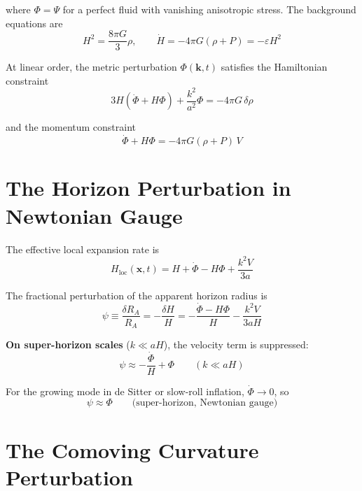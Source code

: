 \documentclass[12pt,a4paper]{article}
\begin{document}
where $\Phi = \Psi$ for a perfect fluid with vanishing anisotropic stress. The background equations are
\begin{equation}
H^2 = \frac{8\pi G}{3}\rho, \qquad \dot{H} = -4\pi G(\rho + P) = -\varepsilon H^2 \tag{3}
\end{equation}

At linear order, the metric perturbation $\Phi(\mathbf{k}, t)$ satisfies the Hamiltonian constraint
\begin{equation}
3H(\dot{\Phi} + H\Phi) + \frac{k^2}{a^2}\Phi = -4\pi G\,\delta\rho \tag{4}
\end{equation}

and the momentum constraint
\begin{equation}
\dot{\Phi} + H\Phi = -4\pi G(\rho + P)\,V \tag{5}
\end{equation}

\section{The Horizon Perturbation in Newtonian Gauge}

The effective local expansion rate is
\begin{equation}
H_\text{loc}(\mathbf{x}, t) = H + \dot{\Phi} - H\Phi + \frac{k^2 V}{3a} \tag{6}
\end{equation}

The fractional perturbation of the apparent horizon radius is
\begin{equation}
\psi \equiv \frac{\delta R_A}{R_A} = -\frac{\delta H}{H} = -\frac{\dot{\Phi} - H\Phi}{H} - \frac{k^2 V}{3aH} \tag{7}
\end{equation}

\textbf{On super-horizon scales} ($k \ll aH$), the velocity term is suppressed:
\begin{equation}
\psi \approx -\frac{\dot{\Phi}}{H} + \Phi \qquad (k \ll aH) \tag{8}
\end{equation}

For the growing mode in de Sitter or slow-roll inflation, $\dot{\Phi} \to 0$, so
\begin{equation}
\psi \approx \Phi \qquad \text{(super-horizon, Newtonian gauge)} \tag{9}
\end{equation}

\section{The Comoving Curvature Perturbation}
\end{document}
